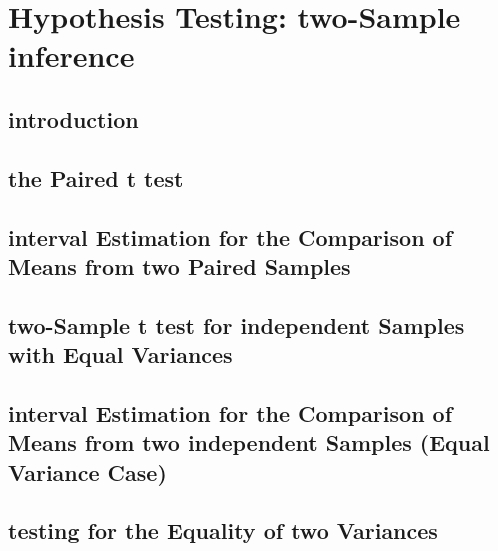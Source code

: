 \documentclass[12pt,]{article}
\begin{document}
\hypertarget{hypothesis-testing-two-sample-inference}{%
\section{Hypothesis Testing: two-Sample
inference}\label{hypothesis-testing-two-sample-inference}}

\hypertarget{introduction-4}{%
\subsection{introduction}\label{introduction-4}}

\hypertarget{the-paired-t-test}{%
\subsection{the Paired t test}\label{the-paired-t-test}}

\hypertarget{interval-estimation-for-the-comparison-of-means-from-two-paired-samples}{%
\subsection{interval Estimation for the Comparison of Means from two
Paired
Samples}\label{interval-estimation-for-the-comparison-of-means-from-two-paired-samples}}

\hypertarget{two-sample-t-test-for-independent-samples-with-equal-variances}{%
\subsection{two-Sample t test for independent Samples with Equal
Variances}\label{two-sample-t-test-for-independent-samples-with-equal-variances}}

\hypertarget{interval-estimation-for-the-comparison-of-means-from-two-independent-samples-equal-variance-case}{%
\subsection{interval Estimation for the Comparison of Means from two
independent Samples (Equal Variance
Case)}\label{interval-estimation-for-the-comparison-of-means-from-two-independent-samples-equal-variance-case}}

\hypertarget{testing-for-the-equality-of-two-variances}{%
\subsection{testing for the Equality of two
Variances}\label{testing-for-the-equality-of-two-variances}}
\end{document}
